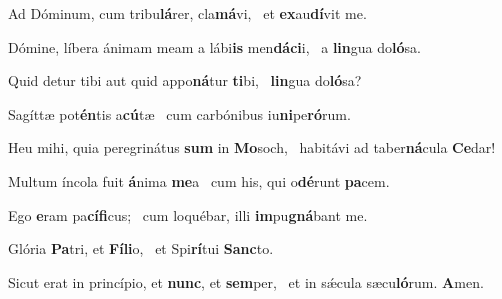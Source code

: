 \item Ad Dóminum, cum tribu\textbf{lá}rer, cla\textbf{má}vi,~\psstar{} et \textbf{ex}au\textbf{dí}vit me.

\item Dómine, líbera ánimam meam a lábi\textbf{is} men\textbf{dá}\textbf{ci}i,~\psstar{} a \textbf{lin}gua do\textbf{ló}sa.

\item Quid detur tibi aut quid appo\textbf{ná}tur \textbf{ti}bi,~\psstar{} \textbf{lin}gua do\textbf{ló}sa?

\item Sagíttæ pot\textbf{én}tis a\textbf{cú}tæ~\psstar{} cum carbónibus iu\textbf{ni}pe\textbf{ró}rum.

\item Heu mihi, quia peregrinátus \textbf{sum} in \textbf{Mo}soch,~\psstar{} habitávi ad taber\textbf{ná}cula \textbf{Ce}dar!

\item Multum íncola fuit \textbf{á}nima \textbf{me}a~\psstar{} cum his, qui o\textbf{dé}runt \textbf{pa}cem.

\item Ego \textbf{e}ram pa\textbf{cí}\textbf{fi}cus;~\psstar{} cum loquébar, illi \textbf{im}pu\textbf{gná}bant me.

\item Glória \textbf{Pa}tri, et \textbf{Fí}\textbf{li}o,~\psstar{} et Spi\textbf{rí}tui \textbf{Sanc}to.

\item Sicut erat in princípio, et \textbf{nunc}, et \textbf{sem}per,~\psstar{} et in sǽcula sæcu\textbf{ló}rum. \textbf{A}men.